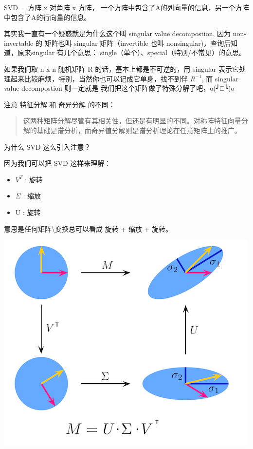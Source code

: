 \documentclass[
]{book}
\providecommand{\tightlist}{%
  \setlength{\itemsep}{0pt}\setlength{\parskip}{0pt}}
\begin{document}
SVD = 方阵 x 对角阵 x 方阵， 一个方阵中包含了A的列向量的信息，另一个方阵中包含了A的行向量的信息。

其实我一直有一个疑惑就是为什么这个叫 singular value decompostion, 因为 non-invertable 的 矩阵也叫 singular 矩阵（invertible 也叫 nonsingular)，查询后知道，原来singular 有几个意思： single（单个）、special（特别/不常见）的意思。

如果我们取 n x n 随机矩阵 R 的话，基本上都是不可逆的，用 singular 表示它处理起来比较麻烦，特别，当然你也可以记成它单身，找不到伴 \(R^{-1}\), 而 singular value decompostion 则一定就是 我们把这个矩阵做了特殊分解了吧，o(╯□╰)o

注意 特征分解 和 奇异分解 的不同：

\begin{quote}
这两种矩阵分解尽管有其相关性，但还是有明显的不同。对称阵特征向量分解的基础是谱分析，而奇异值分解则是谱分析理论在任意矩阵上的推广。
\end{quote}

为什么 SVD 这么引入注意？

因为我们可以把 SVD 这样来理解：

\begin{itemize}
\tightlist
\item
  \(V^T\) : 旋转
\item
  \(\Sigma\) : 缩放
\item
  U : 旋转
\end{itemize}

意思是任何矩阵\textbackslash 变换总可以看成 旋转 + 缩放 + 旋转。

\includegraphics{images/svd_04.png}
\end{document}
